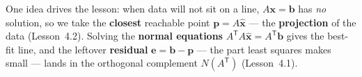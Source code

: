 \documentclass[10pt]{article}
\begin{document}
\vspace{0.10in}

\begin{remindbox}
\small One idea drives the lesson: when data will not sit on a line, $A\mathbf{x}=\mathbf{b}$ has
\emph{no} solution, so we take the \textbf{closest} reachable point $\mathbf{p}=A\hat{\mathbf{x}}$ --- the
\textbf{projection} of the data (Lesson~4.2). Solving the \textbf{normal equations}
$A^{\mathsf{T}}A\hat{\mathbf{x}}=A^{\mathsf{T}}\mathbf{b}$ gives the best-fit line, and the leftover
\textbf{residual} $\mathbf{e}=\mathbf{b}-\mathbf{p}$ --- the part least squares makes small --- lands in
the orthogonal complement $N(A^{\mathsf{T}})$ (Lesson~4.1).
\end{remindbox}
\end{document}
